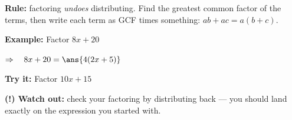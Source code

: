 \documentclass[12pt]{article}
\begin{document}

\begin{formulabox}
\textbf{Rule:} factoring \emph{undoes} distributing. Find the greatest common factor
of the terms, then write each term as GCF times something:
$ab + ac = a(b + c)$.
\end{formulabox}

\begin{examplebox}
\textbf{Example:} \quad Factor $8x + 20$

$\Rightarrow\quad 8x + 20 = \ans{4(2x + 5)}$
\end{examplebox}

\begin{tryitbox}
\textbf{Try it:} \quad Factor $10x + 15$\\[2pt]
\end{tryitbox}

\begin{watchoutbox}
\textbf{(!) Watch out:} check your factoring by distributing back --- you should
land exactly on the expression you started with.
\end{watchoutbox}
\end{document}

